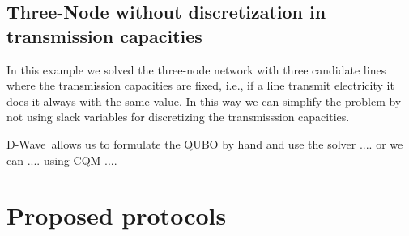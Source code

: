\subsection{Three-Node without discretization in transmission capacities}
In this example we solved the three-node network with three candidate lines where the transmission capacities are fixed, i.e., if a line transmit electricity it does it always with the same value. In this way we can simplify the problem by not using slack variables for discretizing the transmisssion capacities.


D-Wave\,\cite{D-WaveDocumentation} allows us to formulate the QUBO by hand and use the  solver .... or we can .... using CQM ....

\section{Proposed protocols}
